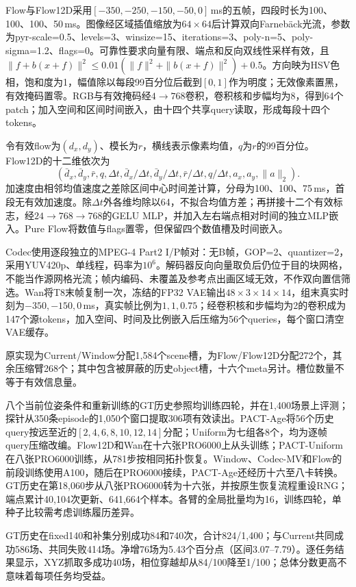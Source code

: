 Flow与Flow12D采用$[-350,-250,-150,-50,0]$\,ms的五帧，四段时长为100、100、100、50\,ms。图像经区域插值缩放为$64\times64$后计算双向Farneb\"ack光流\cite{farneback}，参数为pyr-scale=0.5、levels=3、winsize=15、iterations=3、poly-n=5、poly-sigma=1.2、flags=0。可靠性要求向量有限、端点和反向双线性采样有效，且$\|f+b(x+f)\|^2\leq0.01(\|f\|^2+\|b(x+f)\|^2)+0.5$。方向映为HSV色相，饱和度为1，幅值除以每段99百分位后截到$[0,1]$作为明度；无效像素置黑，有效掩码置零。RGB与有效掩码经$4\to768$卷积，卷积核和步幅均为8，得到64个patch；加入空间和区间时间嵌入，由十四个共享query读取，形成每段十四个tokens。

令有效flow为$(d_x,d_y)$、模长为$r$，横线表示像素均值，$q$为$r$的99百分位。Flow12D的十二维依次为
\[
(\bar d_x,\bar d_y,\bar r,q,\Delta t,
\bar d_x/\Delta t,\bar d_y/\Delta t,\bar r/\Delta t,q/\Delta t,
a_x,a_y,\|a\|_2).
\]
加速度由相邻均值速度之差除区间中心时间差计算，分母为100、100、75\,ms，首段无有效加速度。除$\Delta t$外各维均除以64，不拟合均值方差；再拼接十二个有效标志，经$24\to768\to768$的GELU MLP，并加入左右端点相对时间的独立MLP嵌入。Pure Flow将数值与flags置零，但保留四个数值槽及时间嵌入。

Codec使用逐段独立的MPEG-4 Part2 I/P帧对：无B帧，GOP=2、quantizer=2，采用YUV420p、单线程，码率为$10^6$。解码器反向向量取负后仍位于目的块网格，不能当作源网格光流；帧内编码、未覆盖及参考点出画区域无效，不作双向置信筛选。Wan将T8末帧复制一次，冻结的FP32 VAE输出$48\times3\times14\times14$，组末真实时刻为$-350,-150,0$\,ms，真实帧比例为$1,1,0.75$；经卷积核和步幅均为2的卷积成为147个源tokens，加入空间、时间及比例嵌入后压缩为56个queries，每个窗口清空VAE缓存。

原实现为Current/Window分配1,584个scene槽，为Flow/Flow12D分配272个，其余压缩臂268个；其中包含被屏蔽的历史object槽，十六个meta另计。槽位数量不等于有效信息量。

八个当前位姿条件和重新训练的GT历史参照均训练四轮，并在1,400场景上评测；探针从350条episode的1,050个窗口提取306项有效读出。PACT-Age将56个历史query按远至近的$[2,4,6,8,10,12,14]$分配；Uniform为七组各8个，均为逐帧query压缩改编。Flow12D和Wan在十六张PRO6000上从头训练；PACT-Uniform在八张PRO6000训练，从781步按相同拓扑恢复。Window、Codec-MV和Flow的前段训练使用A100，随后在PRO6000接续，PACT-Age还经历十六至八卡转换。GT历史在第18,060步从八张PRO6000转为十六张，并按原生恢复流程重设RNG；端点累计40,104次更新、641,664个样本。各臂的全局批量均为16，训练四轮，单种子比较需考虑训练履历差异。



\begingroup
\renewcommand{\small}{\fontsize{9}{11}\selectfont}

\endgroup
GT历史在fixed140和补集分别成功84和740次，合计824/1,400；与Current共同成功586场、共同失败414场。净增76场为5.43个百分点（区间3.07--7.79）。逐任务结果显示，XYZ抓取多成功40场，相位穿越却从84/100降至1/100；总体分数更高不意味着每项任务均受益。

